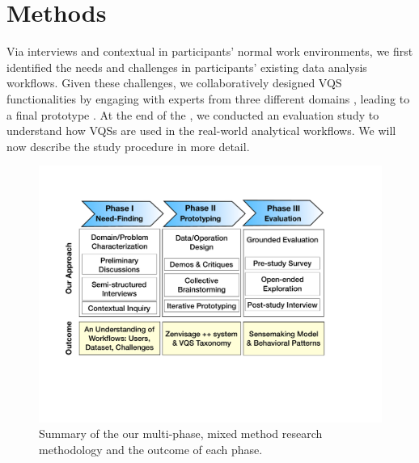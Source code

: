   \section{Methods\label{sec:methods}}
  Via interviews and contextual  in participants' normal work environments, we first identified the needs and challenges in participants' existing data analysis workflows. Given these challenges, we collaboratively designed VQS functionalities by engaging with experts from three different domains , leading to a final prototype \zvpp. At the end of the , we conducted an evaluation study to understand how VQSs are used in the real-world analytical workflows. We will now describe the study procedure in more detail.
  \begin{figure}
    \centering
    \includegraphics[width=0.9\linewidth]{figures/methodFlowchart.pdf}
    \caption{Summary of the our multi-phase, mixed method research methodology and the outcome of each phase.}
    \label{methodFlowchart}
    \vspace*{-10pt}
  \end{figure}
